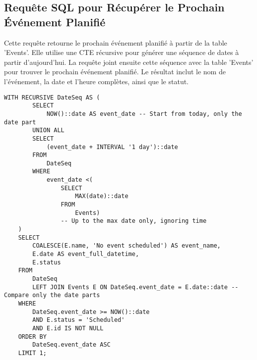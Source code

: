 \subsection{Requête SQL pour Récupérer le Prochain Événement Planifié}

Cette requête retourne le prochain événement planifié à partir de la table 'Events'. Elle utilise une CTE récursive pour générer une séquence de dates à partir d'aujourd'hui. La requête joint ensuite cette séquence avec la table 'Events' pour trouver le prochain événement planifié. Le résultat inclut le nom de l'événement, la date et l'heure complètes, ainsi que le statut.

\begin{lstlisting}
WITH RECURSIVE DateSeq AS (
        SELECT
            NOW()::date AS event_date -- Start from today, only the date part
        UNION ALL
        SELECT
            (event_date + INTERVAL '1 day')::date
        FROM
            DateSeq
        WHERE
            event_date <(
                SELECT
                    MAX(date)::date
                FROM
                    Events)
                -- Up to the max date only, ignoring time
    )
    SELECT
        COALESCE(E.name, 'No event scheduled') AS event_name,
        E.date AS event_full_datetime,
        E.status
    FROM
        DateSeq
        LEFT JOIN Events E ON DateSeq.event_date = E.date::date -- Compare only the date parts
    WHERE
        DateSeq.event_date >= NOW()::date
        AND E.status = 'Scheduled'
        AND E.id IS NOT NULL
    ORDER BY
        DateSeq.event_date ASC
    LIMIT 1;
\end{lstlisting}